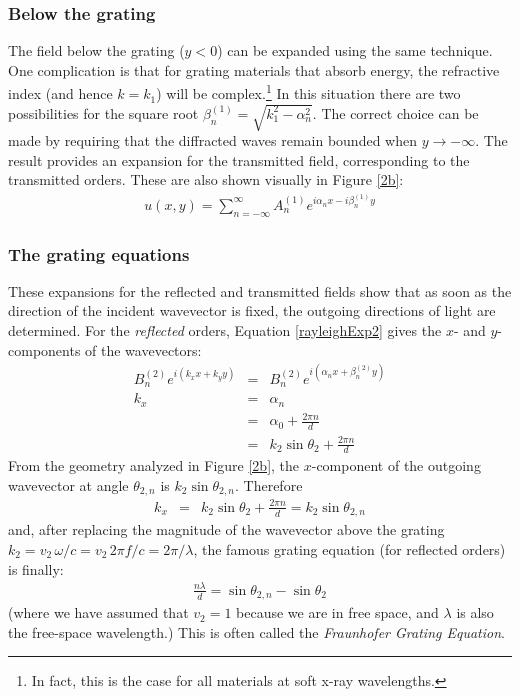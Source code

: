 \subsubsection{Below the grating}
The field below the grating ($y<0$) can be expanded using the same  technique.  One complication is that for grating materials that absorb energy, the refractive index (and hence $k=k_1$) will be complex.\footnote{In fact, this is the case for all materials at soft x-ray wavelengths.}  In this situation there are two possibilities for the square root $\beta^{(1)}_n = \sqrt{k_1^2-\alpha_n^2}$.  The correct choice can be made by requiring that the diffracted waves remain bounded when $y\rightarrow -\infty$.  The result provides an expansion for the transmitted field, corresponding to the transmitted orders.  These are also shown visually in Figure \ref{2b}:
\begin{eqnarray}
\label{gratingEqnT}
u(x,y) =  \sum_{n=-\infty}^{\infty} A^{(1)}_{n} e^{i \alpha_n x - i \beta^{(1)}_{n} y}
\label{rayleighExp1}
\end{eqnarray}

\subsubsection{The grating equations}
These expansions for the reflected and transmitted fields show that as soon as the direction of the incident wavevector is fixed, the outgoing directions of light are determined.  For the \emph{reflected} orders, Equation \ref{rayleighExp2} gives the $x$- and $y$-components of the wavevectors:
\begin{eqnarray}
B^{(2)}_n e^{i(k_x x + k_y y)} &=& B^{(2)}_n e^{i(\alpha_n x + \beta^{(2)}_n y)} \\
k_x &=& \alpha_n \\
  &=& \alpha_0 + \frac{ 2\pi n}{d} \\
  &=& k_2 \sin \theta_2 +\frac{ 2\pi n}{d}
\end{eqnarray}
From the geometry analyzed in Figure \ref{2b}, the $x$-component of the outgoing wavevector at angle $\theta_{2,n}$ is $k_2 \sin \theta_{2,n}$.  Therefore
\begin{eqnarray}
\label{kxEqn2}
k_x &=& k_2 \sin \theta_2 +\frac{ 2\pi n}{d} = k_2 \sin \theta_{2,n}
\end{eqnarray}
and, after replacing the magnitude of the wavevector above the grating $k_2 = v_2\, \omega / c = v_2 \, 2\pi f / c =  2\pi / \lambda$, the famous grating equation (for reflected orders) is finally:
\begin{eqnarray}
\label{gratingEquation}
\frac{n \lambda}{d} = \sin \theta_{2,n} -  \sin \theta_{2}
\end{eqnarray}
(where we have assumed that $v_2 = 1$ because we are in free space, and $\lambda$ is also the free-space wavelength.) This is often called the \emph{Fraunhofer Grating Equation}.


